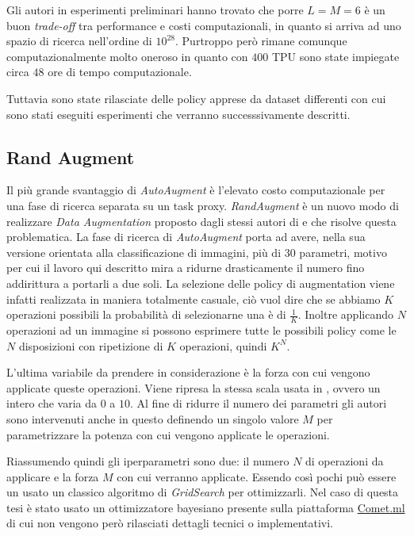 Gli autori in esperimenti preliminari hanno trovato che porre $L = M = 6$ è un buon \textit{trade-off} tra performance e costi computazionali, in quanto si arriva ad uno spazio di ricerca nell'ordine di $10^{28}$. Purtroppo però rimane comunque computazionalmente molto oneroso in quanto con $400$ \ac{TPU} sono state impiegate circa $48$ ore di tempo computazionale. 

Tuttavia sono state rilasciate delle policy apprese da dataset differenti con cui sono stati eseguiti esperimenti che verranno successsivamente descritti. 
\subsection{Rand Augment}
\label{subsec:rand_augment}
Il più grande svantaggio di \textit{AutoAugment} è l'elevato costo computazionale per una fase di ricerca separata su un task proxy. \textit{RandAugment} \cite{DBLP:journals/corr/abs-1909-13719} è un nuovo modo di realizzare \textit{Data Augmentation} proposto dagli stessi autori di \cite{DBLP:journals/corr/abs-1805-09501} e \cite{DBLP:journals/corr/abs-1906-11172} che risolve questa problematica. La fase di ricerca di \textit{AutoAugment} porta ad avere, nella sua versione orientata alla classificazione di immagini, più di 30 parametri, motivo per cui il lavoro qui descritto mira a ridurne drasticamente il numero fino addirittura a portarli a due soli. La selezione delle policy di augmentation viene infatti realizzata in maniera totalmente casuale, ciò vuol dire che se abbiamo $K$ operazioni possibili la probabilità di selezionarne una è di $\frac{1}{K}$. Inoltre applicando $N$ operazioni ad un immagine si possono esprimere tutte le possibili policy come le $N$ disposizioni con ripetizione di $K$ operazioni, quindi $K^N$.

L'ultima variabile da prendere in considerazione è la forza con cui vengono applicate queste operazioni. Viene ripresa la stessa scala usata in \cite{DBLP:journals/corr/abs-1805-09501}, ovvero un intero che varia da $0$ a $10$.
Al fine di ridurre il numero dei parametri gli autori sono intervenuti anche in questo definendo un singolo valore $M$ per parametrizzare la potenza con cui vengono applicate le operazioni. 

Riassumendo quindi gli iperparametri sono due: il numero $N$ di operazioni da applicare e la forza $M$ con cui verranno applicate. Essendo così pochi può essere un usato un classico algoritmo di \textit{GridSearch} per ottimizzarli. Nel caso di questa tesi è stato usato un ottimizzatore bayesiano presente sulla piattaforma \href{https://www.comet.ml/}{Comet.ml} di cui non vengono però rilasciati dettagli tecnici o implementativi.

